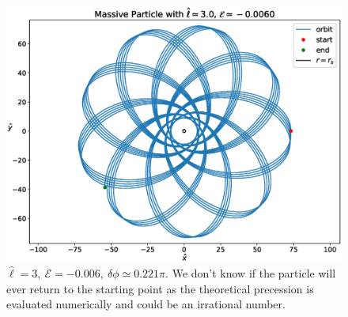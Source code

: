 \begin{figure}[h!]
    \centering
    \includegraphics[width=0.85 \textwidth]{Figures/appendixB/spirograph.eps}
    \caption{$\hat \ell = 3, ~ \mathcal E = -0.006, ~ \delta \phi \simeq 0.221
    \pi$.
    We don't know if the particle will ever return to the starting point as the
    theoretical precession is evaluated numerically and could be an irrational
    number.}
    \label{appB:fig:spirograph}
\end{figure}
